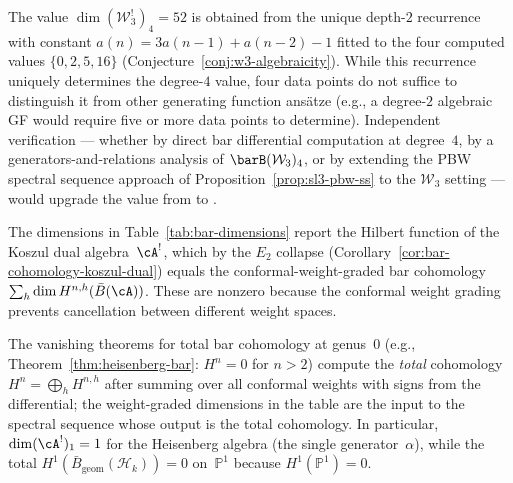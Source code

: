 \begin{remark}[Status of \texorpdfstring{$H^4(\mathcal{W}_3) = 52$}{H4(W3) = 52}]
\label{rem:w3-h4-status}
The value $\dim(\mathcal{W}_3^!)_4 = 52$ is obtained from the unique
depth-$2$ recurrence with constant $a(n) = 3a(n{-}1) + a(n{-}2) - 1$
fitted to the four computed values $\{0, 2, 5, 16\}$
(Conjecture~\ref{conj:w3-algebraicity}).  While this recurrence uniquely
determines the degree-$4$ value, four data points do not suffice to
distinguish it from other generating function ansätze (e.g., a degree-$2$
algebraic GF would require five or more data points to determine).
Independent verification --- whether by direct bar differential computation
at degree~$4$, by a generators-and-relations analysis of
$\barB(\mathcal{W}_3)_4$, or by extending the PBW spectral sequence
approach of Proposition~\ref{prop:sl3-pbw-ss} to the $\mathcal{W}_3$
setting --- would upgrade the value from \ClaimStatusConjectured{} to
\ClaimStatusProvedHere{}.
\end{remark}

\begin{remark}\label{rem:table-vs-vanishing}
The dimensions in Table~\ref{tab:bar-dimensions} report the
Hilbert function of the Koszul dual algebra~$\cA^!$, which by the
$E_2$ collapse (Corollary~\ref{cor:bar-cohomology-koszul-dual})
equals the conformal-weight-graded bar cohomology
$\sum_h \dim H^{n,h}(\bar{B}(\cA))$.
These are nonzero because the conformal weight grading
prevents cancellation between different weight spaces.

The vanishing theorems for total bar cohomology at genus~$0$
(e.g., Theorem~\ref{thm:heisenberg-bar}: $H^n = 0$ for $n > 2$)
compute the \emph{total} cohomology $H^n = \bigoplus_h H^{n,h}$
after summing over all conformal weights with signs from the
differential; the weight-graded dimensions in the table are the
input to the spectral sequence whose output is the total
cohomology.  In particular, $\dim (\cA^!)_1 = 1$ for the
Heisenberg algebra (the single generator~$\alpha$), while the
total $H^1(\bar{B}_{\mathrm{geom}}(\mathcal{H}_k)) = 0$
on~$\mathbb{P}^1$ because $H^1(\mathbb{P}^1) = 0$.
\end{remark}

